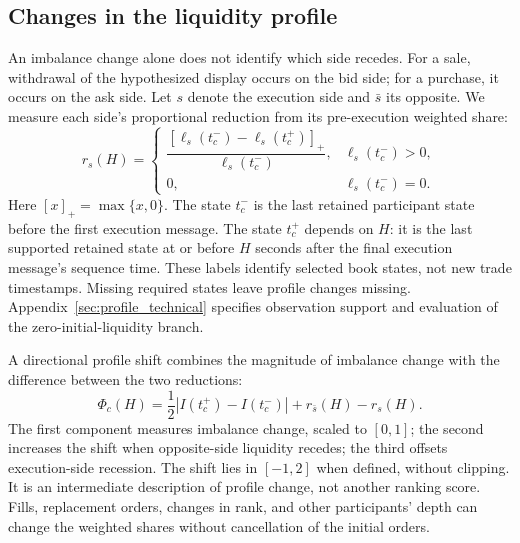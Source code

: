 

\subsection{Changes in the liquidity profile}
\label{subsec:multilevel_conditionality}
\label{subsec:msci_grid_method}
An imbalance change alone does not identify which side recedes. For a sale, withdrawal of the hypothesized display occurs on the bid side; for a purchase, it occurs on the ask side. Let $s$ denote the execution side and $\bar s$ its opposite. We measure each side's proportional reduction from its pre-execution weighted share:
\begin{equation}
    r_s(H)=\begin{cases}
        \dfrac{[\ell_s(t_c^-)-\ell_s(t_c^+)]_+}{\ell_s(t_c^-)},
            &\ell_s(t_c^-)>0,\\[4pt]
        0,&\ell_s(t_c^-)=0.
    \end{cases}
    \label{eq:side_collapse}
\end{equation}
Here $[x]_+=\max\{x,0\}$. The state $t_c^-$ is the last retained participant state before the first execution message. The state $t_c^+$ depends on $H$: it is the last supported retained state at or before $H$ seconds after the final execution message's sequence time. These labels identify selected book states, not new trade timestamps. Missing required states leave profile changes missing. Appendix~\ref{sec:profile_technical} specifies observation support and evaluation of the zero-initial-liquidity branch.

A directional profile shift combines the magnitude of imbalance change with the difference between the two reductions:
\begin{equation}
    \Phi_c(H)=\frac12\left|I(t_c^+)-I(t_c^-)\right|
                 +r_{\bar s}(H)-r_s(H).
    \label{eq:signed_msci}
\end{equation}
The first component measures imbalance change, scaled to $[0,1]$; the second increases the shift when opposite-side liquidity recedes; the third offsets execution-side recession. The shift lies in $[-1,2]$ when defined, without clipping. It is an intermediate description of profile change, not another ranking score. Fills, replacement orders, changes in rank, and other participants' depth can change the weighted shares without cancellation of the initial orders.

